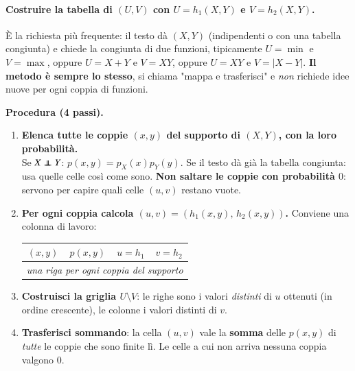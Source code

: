 \documentclass[12pt]{extarticle} %
\newcommand\independent{\protect\mathpalette{\protect\independenT}{\perp}}
\def\independenT#1#2{\mathrel{\rlap{$#1#2$}\mkern2mu{#1#2}}}
\begin{document}
\paragraph{Costruire la tabella di $(U,V)$ con $U = h_1(X,Y)$ e $V = h_2(X,Y)$.} È la richiesta più frequente: il testo dà $(X,Y)$ (indipendenti o con una tabella congiunta) e chiede la congiunta di due funzioni, tipicamente $U=\min$ e $V=\max$, oppure $U=X+Y$ e $V=XY$, oppure $U=XY$ e $V=|X-Y|$. \textbf{Il metodo è sempre lo stesso}, si chiama "mappa e trasferisci" e \emph{non} richiede idee nuove per ogni coppia di funzioni.

\textbf{Procedura (4 passi).}
\begin{enumerate}
    \item \textbf{Elenca tutte le coppie $(x,y)$ del supporto di $(X,Y)$, con la loro probabilità.} \\ {\footnotesize Se $X \independent Y$: $p(x,y) = p_X(x)p_Y(y)$. Se il testo dà già la tabella congiunta: usa quelle celle così come sono. \textbf{Non saltare le coppie con probabilità $0$}: servono per capire quali celle $(u,v)$ restano vuote.}
    \item \textbf{Per ogni coppia calcola $(u,v) = (h_1(x,y),\, h_2(x,y))$.} Conviene una colonna di lavoro:
    \begin{center}\footnotesize
    \renewcommand{\arraystretch}{1.1}
    \begin{tabular}{|c|c|c|c|}
    \hline $(x,y)$ & $p(x,y)$ & $u = h_1$ & $v = h_2$ \\ \hline
    \multicolumn{4}{|c|}{\textit{una riga per ogni coppia del supporto}} \\ \hline
    \end{tabular}
    \end{center}
    \item \textbf{Costruisci la griglia $U \setminus V$}: le righe sono i valori \emph{distinti} di $u$ ottenuti (in ordine crescente), le colonne i valori distinti di $v$.
    \item \textbf{Trasferisci sommando}: la cella $(u,v)$ vale la \textbf{somma} delle $p(x,y)$ di \emph{tutte} le coppie che sono finite lì. Le celle a cui non arriva nessuna coppia valgono $0$.
\end{enumerate}
\end{document}
